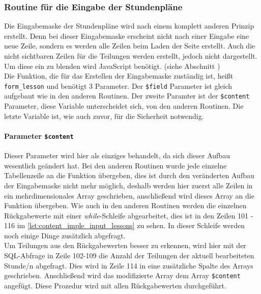 \subsubsection{Routine für die Eingabe der Stundenpläne}
Die Eingabemaske der Stundenpläne wird nach einem komplett anderen Prinzip erstellt. Denn bei dieser Eingabemaske erscheint nicht nach einer Eingabe eine neue Zeile, sondern es werden alle Zeilen beim Laden der Seite erstellt. Auch die nicht sichtbaren Zeilen für die Teilungen werden erstellt, jedoch nicht dargestellt. Um diese ein zu blenden wird JavaScript benötigt. (siehe Abschnitt )\\
Die Funktion, die für das Erstellen der Eingabemaske zuständig ist, heißt \texttt{form\_lesson} und benötigt 3 Parameter. Der \texttt{\$field} Parameter ist gleich aufgebaut wie in den anderen Routinen. Der zweite Paramter ist der \texttt{\$content} Parameter, diese Variable unterscheidet sich, von den anderen Routinen. Die letzte Variable ist, wie auch zuvor, für die Sicherheit notwendig.
\paragraph{Parameter \texttt{\$content}\\}
Dieser Parameter wird hier als einziges behandelt, da sich dieser Aufbau wesentlich geändert hat. Bei den anderen Routinen wurde jede einzelne Tabellenzeile an die Funktion übergeben, dies ist durch den veränderten Aufbau der Eingabemaske nicht mehr möglich, deshalb werden hier zuerst alle Zeilen in ein mehrdimensionales Array geschrieben, anschließend wird dieses Array an die Funktion übergeben. Wie auch in den anderen Routinen werden die einzelnen Rückgabewerte mit einer \textit{while}-Schleife abgearbeitet, dies ist in den Zeilen 101 - 116 im \autoref{lst:content_imple_input_lessons} zu sehen. In dieser Schleife werden noch einige Dinge zusätzlich abgefragt.\\
Um Teilungen aus den Rückgabewerten besser zu erkennen, wird hier mit der SQL-Abfrage in Zeile 102-109 die Anzahl der Teilungen der aktuell bearbeiteten Stunde/n abgefragt. Dies wird in Zeile 114 in eine zusätzliche Spalte des Arrays geschrieben. Anschließend wird das modifizierte Array dem Array \texttt{\$content} angefügt. Diese Prozedur wird mit allen Rückgabewerten durchgeführt.\\

